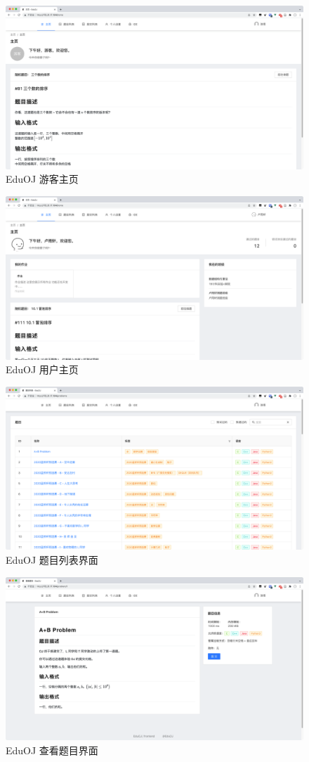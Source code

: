 \documentclass{ctexrep}
\begin{document}
\begin{appendix}
\begin{figure}
    \centering
    \includegraphics[width=0.8\linewidth]{EduOJ-7.png}
    \caption{EduOJ 游客主页}
\end{figure}
\begin{figure}
    \centering
    \includegraphics[width=0.8\linewidth]{EduOJ-8.png}
    \caption{EduOJ 用户主页}
\end{figure}

\begin{figure}
    \centering
    \includegraphics[width=0.8\linewidth]{EduOJ-6.png}
    \caption{EduOJ 题目列表界面}
\end{figure}

\begin{figure}
    \centering
    \includegraphics[width=0.8\linewidth]{EduOJ-5.png}
    \caption{EduOJ 查看题目界面}
\end{figure}


\end{appendix}
\end{document}
